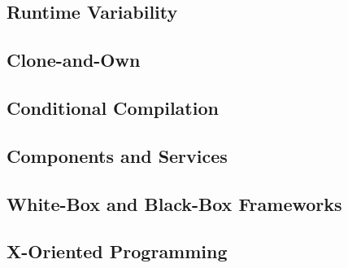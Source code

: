 
\subsection{Runtime Variability}
\subsection{Clone-and-Own}
\subsection{Conditional Compilation}
\subsection{Components and Services}
\subsection{White-Box and Black-Box Frameworks}
\subsection{X-Oriented Programming}





























